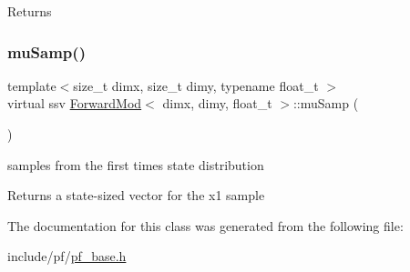\begin{DoxyReturn}{Returns}

\end{DoxyReturn}
\mbox{\label{classForwardMod_aa768950ea619560a820905eb71eed82c}} 
\subsubsection{\texorpdfstring{mu\+Samp()}{muSamp()}}
{\footnotesize\ttfamily template$<$size\+\_\+t dimx, size\+\_\+t dimy, typename float\+\_\+t $>$ \\
virtual ssv \hyperlink{classForwardMod}{Forward\+Mod}$<$ dimx, dimy, float\+\_\+t $>$\+::mu\+Samp (\begin{DoxyParamCaption}{ }\end{DoxyParamCaption})\hspace{0.3cm}{\ttfamily [pure virtual]}}



samples from the first time\textquotesingle{}s state distribution 

\begin{DoxyReturn}{Returns}
a state-\/sized vector for the x1 sample 
\end{DoxyReturn}


The documentation for this class was generated from the following file\+:\begin{DoxyCompactItemize}
\item 
include/pf/\hyperlink{pf__base_8h}{pf\+\_\+base.\+h}\end{DoxyCompactItemize}
